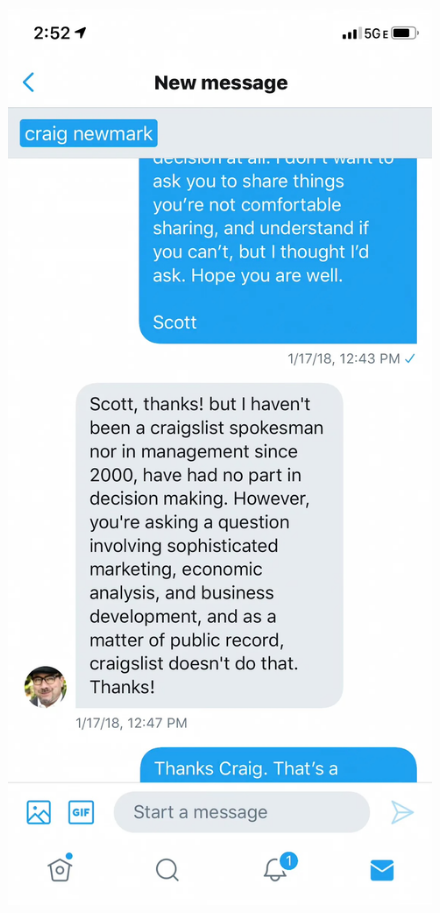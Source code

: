 \documentclass{beamer}
\begin{document}
\begin{frame}[shrink=20]
    \centering
    \begin{center}
    \begin{figure}
        \includegraphics[width=\textwidth]{./lecture_includes/craig_dm}
    \end{figure}
    \end{center}
    

    
\end{frame}
\end{document}
